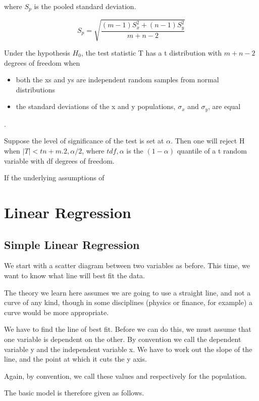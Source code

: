 \documentclass[12pt, a4paper]{report}
\theoremstyle{plain}
\theoremstyle{definition}
\theoremstyle{remark}
\begin{document}
where $S_{p}$ is the pooled standard deviation.

\begin{equation}
S_{p} = \sqrt{ \frac{(m-1)S^{2}_{x} +  (n-1)S^{2}_{y}}{m + n - 2}}
\end{equation}

Under the hypothesis $H_{0}$, the test statistic T has a t
distribution with $m + n - 2$ degrees of freedom when
\begin{itemize} \item both the xs and ys are independent random samples
from normal distributions \item the standard deviations of the x
and y populations, $\sigma_{x}$ and $\sigma_{y}$, are equal
\end{itemize}.

Suppose the level of significance of the test is set at $\alpha$.
Then one will reject H when $|T| < tn+m.2,\alpha/2$, where
$tdf,\alpha$ is the $(1 - \alpha)$ quantile of a t random variable
with df degrees of freedom.

If the underlying assumptions of


\chapter{Linear Regression}
\section{Simple Linear Regression}

We start with a scatter diagram between two variables as before. This time, we want
to know what line will best fit the data.

The theory we learn here assumes we are going to use a straight line, and not a curve of any kind, though in some disciplines (physics or finance, for example) a curve would be more appropriate.

We have to find the line of best fit. Before we can do this, we must assume that one
variable is dependent on the other. By convention we call the dependent variable y
and the independent variable x. We have to work out the slope of the line, and the
point at which it cuts the y axis.

Again, by convention, we call these values and respectively for the population.

The basic model is therefore given as follows.
\end{document}
